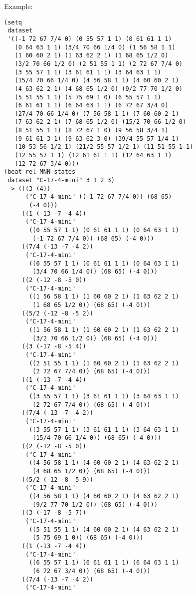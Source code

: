 \vspace{0.5cm}
\noindent Example:
\begin{verbatim}
(setq
 dataset
 '((-1 72 67 7/4 0) (0 55 57 1 1) (0 61 61 1 1)
   (0 64 63 1 1) (3/4 70 66 1/4 0) (1 56 58 1 1)
   (1 60 60 2 1) (1 63 62 2 1) (1 68 65 1/2 0)
   (3/2 70 66 1/2 0) (2 51 55 1 1) (2 72 67 7/4 0)
   (3 55 57 1 1) (3 61 61 1 1) (3 64 63 1 1)
   (15/4 70 66 1/4 0) (4 56 58 1 1) (4 60 60 2 1)
   (4 63 62 2 1) (4 68 65 1/2 0) (9/2 77 70 1/2 0)
   (5 51 55 1 1) (5 75 69 1 0) (6 55 57 1 1)
   (6 61 61 1 1) (6 64 63 1 1) (6 72 67 3/4 0)
   (27/4 70 66 1/4 0) (7 56 58 1 1) (7 60 60 2 1)
   (7 63 62 2 1) (7 68 65 1/2 0) (15/2 70 66 1/2 0)
   (8 51 55 1 1) (8 72 67 1 0) (9 56 58 3/4 1)
   (9 61 61 3 1) (9 63 62 3 0) (39/4 55 57 1/4 1)
   (10 53 56 1/2 1) (21/2 55 57 1/2 1) (11 51 55 1 1)
   (12 55 57 1 1) (12 61 61 1 1) (12 64 63 1 1)
   (12 72 67 3/4 0)))
(beat-rel-MNN-states
 dataset "C-17-4-mini" 3 1 2 3)
--> (((3 (4))
      ("C-17-4-mini" ((-1 72 67 7/4 0)) (68 65)
       (-4 0)))
     ((1 (-13 -7 -4 4))
      ("C-17-4-mini"
       ((0 55 57 1 1) (0 61 61 1 1) (0 64 63 1 1)
        (-1 72 67 7/4 0)) (68 65) (-4 0)))
     ((7/4 (-13 -7 -4 2))
      ("C-17-4-mini"
       ((0 55 57 1 1) (0 61 61 1 1) (0 64 63 1 1)
        (3/4 70 66 1/4 0)) (68 65) (-4 0)))
     ((2 (-12 -8 -5 0))
      ("C-17-4-mini"
       ((1 56 58 1 1) (1 60 60 2 1) (1 63 62 2 1)
        (1 68 65 1/2 0)) (68 65) (-4 0)))
     ((5/2 (-12 -8 -5 2))
      ("C-17-4-mini"
       ((1 56 58 1 1) (1 60 60 2 1) (1 63 62 2 1)
        (3/2 70 66 1/2 0)) (68 65) (-4 0)))
     ((3 (-17 -8 -5 4))
      ("C-17-4-mini"
       ((2 51 55 1 1) (1 60 60 2 1) (1 63 62 2 1)
        (2 72 67 7/4 0)) (68 65) (-4 0)))
     ((1 (-13 -7 -4 4))
      ("C-17-4-mini"
       ((3 55 57 1 1) (3 61 61 1 1) (3 64 63 1 1)
        (2 72 67 7/4 0)) (68 65) (-4 0)))
     ((7/4 (-13 -7 -4 2))
      ("C-17-4-mini"
       ((3 55 57 1 1) (3 61 61 1 1) (3 64 63 1 1)
        (15/4 70 66 1/4 0)) (68 65) (-4 0)))
     ((2 (-12 -8 -5 0))
      ("C-17-4-mini"
       ((4 56 58 1 1) (4 60 60 2 1) (4 63 62 2 1)
        (4 68 65 1/2 0)) (68 65) (-4 0)))
     ((5/2 (-12 -8 -5 9))
      ("C-17-4-mini"
       ((4 56 58 1 1) (4 60 60 2 1) (4 63 62 2 1)
        (9/2 77 70 1/2 0)) (68 65) (-4 0)))
     ((3 (-17 -8 -5 7))
      ("C-17-4-mini"
       ((5 51 55 1 1) (4 60 60 2 1) (4 63 62 2 1)
        (5 75 69 1 0)) (68 65) (-4 0)))
     ((1 (-13 -7 -4 4))
      ("C-17-4-mini"
       ((6 55 57 1 1) (6 61 61 1 1) (6 64 63 1 1)
        (6 72 67 3/4 0)) (68 65) (-4 0)))
     ((7/4 (-13 -7 -4 2))
      ("C-17-4-mini"

\end{verbatim}
